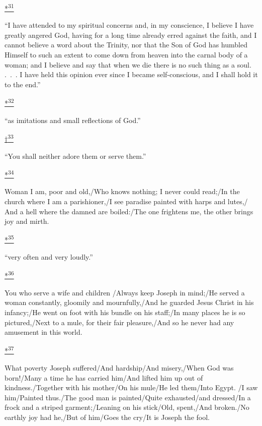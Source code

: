 \protect\hypertarget{23_NOTES.xhtmlux5cux23id_3050}{\protect\hyperlink{13_Chapter_Six__THE_DEPICTION_OF_TH.xhtmlux5cux23id_3049}{*\textsuperscript{31}}}
``I have attended to my spiritual concerns and, in my conscience, I
believe I have greatly angered God, having for a long time already erred
against the faith, and I cannot believe a word about the Trinity, nor
that the Son of God has humbled Himself to such an extent to come down
from heaven into the carnal body of a woman; and I believe and say that
when we die there is no such thing as a soul. .~.~. I have held this
opinion ever since I became self-conscious, and I shall hold it to the
end.''

\protect\hypertarget{23_NOTES.xhtmlux5cux23id_3052}{\protect\hyperlink{13_Chapter_Six__THE_DEPICTION_OF_TH.xhtmlux5cux23id_3051}{*\textsuperscript{32}}}
``as imitations and small reflections of God.''

\protect\hypertarget{23_NOTES.xhtmlux5cux23id_3054}{\protect\hyperlink{13_Chapter_Six__THE_DEPICTION_OF_TH.xhtmlux5cux23id_3053}{†\textsuperscript{33}}}
``You shall neither adore them or serve them.''

\protect\hypertarget{23_NOTES.xhtmlux5cux23id_3056}{\protect\hyperlink{13_Chapter_Six__THE_DEPICTION_OF_TH.xhtmlux5cux23id_3055}{*\textsuperscript{34}}}
Woman I am, poor and old,/Who knows nothing; I never could read;/In the
church where I am a parishioner,/I see paradise painted with harps and
lutes,/ And a hell where the damned are boiled:/The one frightens me,
the other brings joy and mirth.

\protect\hypertarget{23_NOTES.xhtmlux5cux23id_3058}{\protect\hyperlink{13_Chapter_Six__THE_DEPICTION_OF_TH.xhtmlux5cux23id_3057}{*\textsuperscript{35}}}
``very often and very loudly.''

\protect\hypertarget{23_NOTES.xhtmlux5cux23id_3060}{\protect\hyperlink{13_Chapter_Six__THE_DEPICTION_OF_TH.xhtmlux5cux23id_3059}{*\textsuperscript{36}}}
You who serve a wife and children /Always keep Joseph in mind;/He served
a woman constantly, gloomily and mournfully,/And he guarded Jesus Christ
in his infancy;/He went on foot with his bundle on his staff;/In many
places he is so pictured,/Next to a mule, for their fair pleasure,/And
so he never had any amusement in this world.

\protect\hypertarget{23_NOTES.xhtmlux5cux23id_3062}{\protect\hyperlink{13_Chapter_Six__THE_DEPICTION_OF_TH.xhtmlux5cux23id_3061}{*\textsuperscript{37}}}
What poverty Joseph suffered/And hardship/And misery,/When God was
born!/Many a time he has carried him/And lifted him up out of
kindness./Together with his mother/On his mule/He led them/Into Egypt.
/I saw him/Painted thus./The good man is painted/Quite exhausted/and
dressed/In a frock and a striped garment;/Leaning on his stick/Old,
spent,/And broken./No earthly joy had he,/But of him/Goes the cry/It is
Joseph the fool.

